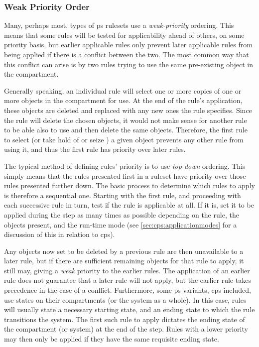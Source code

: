 \subsubsection{Weak Priority Order}

Many, perhaps most, types of \gls{ps} \glspl{ruleset} use a \emph{weak-priority} ordering.  This means that some rules will be tested for applicability ahead of others, on some priority basis, but earlier applicable rules only prevent later applicable rules from being applied if there is a conflict between the two.  The most common way that this conflict can arise is by two rules trying to use the same pre-existing object in the \gls{compartment}.

Generally speaking, an individual rule will select one or more copies of one or more objects in the \gls{compartment} for use.  At the end of the rule's application, these objects are deleted and replaced with any new ones the rule specifies.  Since the rule will delete the chosen objects, it would not make sense for another rule to be able also to use and then delete the same objects.  Therefore, the first rule to select (or take hold of or seize \etc{}) a given object prevents any other rule from using it, and thus the first rule has priority over later rules.

The typical method of defining rules' priority is to use \emph{top-down} ordering.  This simply means that the rules presented first in a \gls{ruleset} have priority over those rules presented further down.  The basic process to determine which rules to apply is therefore a sequential one.  Starting with the first rule, and proceeding with each successive rule in turn, test if the rule is applicable at all.  If it is, set it to be applied during the step as many times as possible depending on the rule, the objects present, and the run-time mode (see \eg{} \cref{sec:cps:applicationmodes} for a discussion of this in relation to \gls{cps}).

Any objects now set to be deleted by a previous rule are then unavailable to a later rule, but if there are sufficient remaining objects for that rule to apply, it still may, giving a \emph{weak} priority to the earlier rules.  The application of an earlier rule does not guarantee that a later rule will not apply, but the earlier rule takes precedence in the case of a conflict.  Furthermore, some \gls{ps} variants, \gls{cps} included, use states on their \glspl{compartment} (or the system as a whole).  In this case, rules will usually state a necessary starting state, and an ending state to which the rule transitions the system.  The first such rule to apply dictates the ending state of the \gls{compartment} (or system) at the end of the step.  Rules with a lower priority may then only be applied if they have the same requisite ending state.

